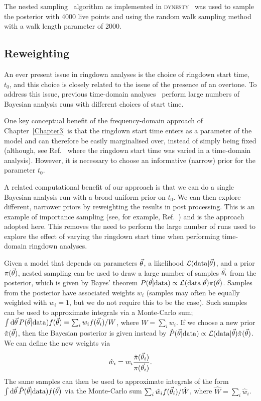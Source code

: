 The nested sampling~\cite{Skilling:2006gxv} algorithm as implemented in \textsc{dynesty}~\cite{Speagle:2019ivv} was used to sample the posterior with 4000 live points and using the random walk sampling method with a walk length parameter of 2000.


\subsection{Reweighting} \label{subsec:reweighting}

An ever present issue in ringdown analyses is the choice of ringdown start time, $t_0$, and this choice is closely related to the issue of the presence of an overtone.
To address this issue, previous time-domain analyses~\cite{Isi:2019aib, Cotesta:2022pci, Isi:2022mhy} perform large numbers of Bayesian analysis runs with different choices of start time.

One key conceptual benefit of the frequency-domain approach of Chapter~\ref{Chapter3} is that the ringdown start time enters as a parameter of the model and can therefore be easily marginalised over, instead of simply being fixed (although, see Ref.~\cite{Carullo:2019flw} where the ringdown start time was varied in a time-domain analysis). 
However, it is necessary to choose an informative (narrow) prior for the parameter $t_0$.

A related computational benefit of our approach is that we can do a single Bayesian analysis run with a broad uniform prior on $t_0$. 
We can then explore different, narrower priors by reweighting the results in post processing. 
This is an example of importance sampling (see, for example, Ref.~\cite{RobertChristian2013MCsm}) and is the approach adopted here.
This removes the need to perform the large number of runs used to explore the effect of varying the ringdown start time when performing time-domain ringdown analyses.

Given a model that depends on parameters $\vec{\theta}$, a likelihood $\mathcal{L}(\mathrm{data}|\vec{\theta})$, and a prior $\pi(\vec{\theta})$, nested sampling can be used to draw a large number of samples $\vec{\theta}_i$ from the posterior, which is given by Bayes' theorem $P(\vec{\theta}|\mathrm{data})\propto \mathcal{L}(\mathrm{data}|\vec{\theta}) \pi(\vec{\theta})$.
Samples from the posterior have associated weights $w_i$ (samples may often be equally weighted with $w_i=1$, but we do not require this to be the case). 
Such samples can be used to approximate integrals via a Monte-Carlo sum; $\int \mathrm{d}\vec{\theta}\,P(\vec{\theta}|\mathrm{data})f(\vec{\theta})=\sum_{i}w_i f(\vec{\theta}_i)/W$, where $W=\sum_{i}w_i$.
If we choose a new prior $\hat{\pi}(\vec{\theta})$, then the Bayesian posterior is given instead by $\hat{P}(\vec{\theta}|\mathrm{data})\propto \mathcal{L}(\mathrm{data}|\vec{\theta}) \hat{\pi}(\vec{\theta})$.
We can define the new weights via
\begin{align}
	\hat{w}_i = w_i \frac{\hat{\pi}(\vec{\theta}_i)}{\pi(\vec{\theta}_i)}.
\end{align}
The same samples can then be used to approximate integrals of the form $\int \mathrm{d}\vec{\theta}\,\hat{P}(\vec{\theta}|\mathrm{data})f(\vec{\theta})$ via the Monte-Carlo sum $\sum_{i}\hat{w}_i f(\vec{\theta}_i)/\hat{W}$, where $\hat{W}=\sum_{i}\hat{w}_i$.

